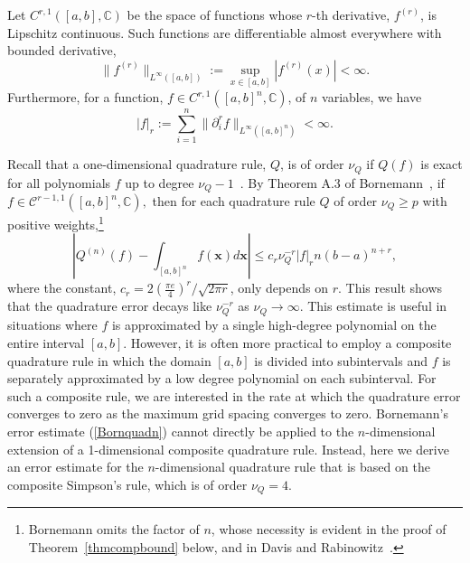 \documentclass{birkjour}
\theoremstyle{definition}
\theoremstyle{remark}
\numberwithin{equation}{section}
\begin{document}
Let  $C^{r,1}([a,b], \mathbb{C})$ be the space of functions whose  
$r$-th derivative, $f^{(r)}$, is Lipschitz continuous.  Such
functions are differentiable almost everywhere with bounded derivative,
\begin{equation}
    \|f^{(r)}\|_{L^{\infty}([a,b])} := \sup_{x \in [a,b]} |f^{(r)}(x)| < \infty.
\end{equation}
Furthermore, for a function, $f\in C^{r,1}([a,b]^n, \mathbb{C})$, of $n$ variables,
we have 
\begin{equation}
    |f|_r := \sum\limits_{i=1}^n \| \partial_i^r f \|_{L^{\infty}([a,b]^n)}   < \infty.
\end{equation}



Recall that a one-dimensional quadrature rule, $Q$, is of order $\nu_Q$ if $Q(f)$ is exact for all polynomials $f$ up to degree $\nu_Q - 1$~\cite{atkinson2008introduction}.
By Theorem A.3 of Bornemann~\cite{Bornemann}, if 
$f \in \mathcal{C}^{r-1,1}([a,b]^n,\mathbb C),$ then for each quadrature rule $Q$ of order $\nu_Q \geq p$ with positive weights,\footnote{Bornemann omits the  factor of $n$, whose
necessity is evident in the proof of Theorem~\ref{thmcompbound} below, and in Davis and Rabinowitz~\cite[p. 361]{DavisRabinowitz}.}
\begin{equation}\label{Bornquadn}
    \left| Q^{(n)}(f) - \int_{[a,b]^n} f(\mathbf x) d\mathbf x \right| \leq c_r \nu_Q^{-r} 
    |f|_r  n (b-a)^{n+r},
\end{equation}
where the constant, $c_r=2\left(\frac{\pi e}{4}\right)^r / \sqrt{2 \pi r}$, only depends on $r$.
This result shows that the quadrature error decays like $\nu_Q^{-r}$ as $\nu_Q \rightarrow \infty$. This estimate is useful in situations where $f$ is approximated by a single high-degree polynomial on the entire interval $[a,b].$ However,  it is often more practical to 
employ a composite quadrature rule in which the domain $[a,b]$ is divided into 
subintervals and $f$ is separately approximated  by a low degree polynomial on each subinterval.
For such a composite rule, we are interested in the rate at which the quadrature error converges to zero as the maximum grid spacing converges to zero.  Bornemann's error estimate (\ref{Bornquadn}) cannot directly be applied to the $n$-dimensional  extension of a 
1-dimensional composite quadrature rule. Instead, here we  derive an error estimate for the $n$-dimensional quadrature rule that is based on the composite Simpson's rule, which is of order $\nu_Q = 4$.
\end{document}
